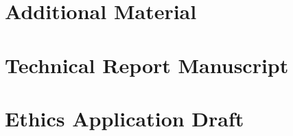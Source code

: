 \chapter{Additional Material}
\label{appx:additional-material}
\cleardoublepage


\chapter{Technical Report Manuscript}
\label{appx:tech-report}
\cleardoublepage


\chapter{Ethics Application Draft}
\label{appx:ethics}
\cleardoublepage


